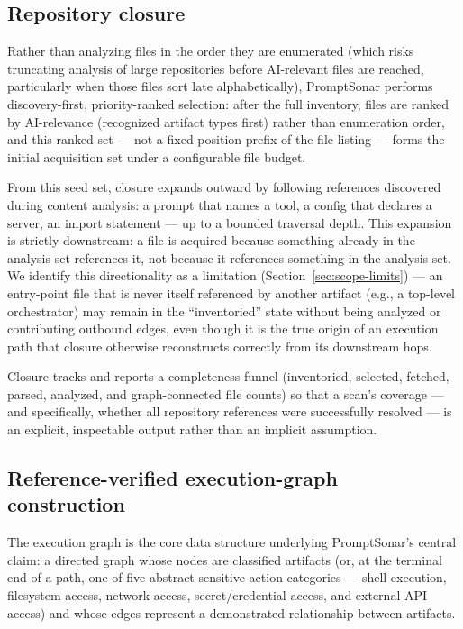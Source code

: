 \documentclass[sigconf,anonymous,review]{acmart}
\newcommand{\sysname}{PromptSonar}
\begin{document}
\subsection{Repository closure}
\label{sec:closure}
Rather than analyzing files in the order they are enumerated (which risks truncating analysis of large repositories before AI-relevant files are reached, particularly when those files sort late alphabetically), \sysname{} performs discovery-first, priority-ranked selection: after the full inventory, files are ranked by AI-relevance (recognized artifact types first) rather than enumeration order, and this ranked set --- not a fixed-position prefix of the file listing --- forms the initial acquisition set under a configurable file budget.

From this seed set, closure expands outward by following references discovered during content analysis: a prompt that names a tool, a config that declares a server, an import statement --- up to a bounded traversal depth. This expansion is strictly downstream: a file is acquired because something already in the analysis set references it, not because it references something in the analysis set. We identify this directionality as a limitation (Section~\ref{sec:scope-limits}) --- an entry-point file that is never itself referenced by another artifact (e.g., a top-level orchestrator) may remain in the ``inventoried'' state without being analyzed or contributing outbound edges, even though it is the true origin of an execution path that closure otherwise reconstructs correctly from its downstream hops.

Closure tracks and reports a completeness funnel (inventoried, selected, fetched, parsed, analyzed, and graph-connected file counts) so that a scan's coverage --- and specifically, whether all repository references were successfully resolved --- is an explicit, inspectable output rather than an implicit assumption.

\subsection{Reference-verified execution-graph construction}
\label{sec:graph}
The execution graph is the core data structure underlying \sysname{}'s central claim: a directed graph whose nodes are classified artifacts (or, at the terminal end of a path, one of five abstract sensitive-action categories --- shell execution, filesystem access, network access, secret/credential access, and external API access) and whose edges represent a demonstrated relationship between artifacts.
\end{document}

